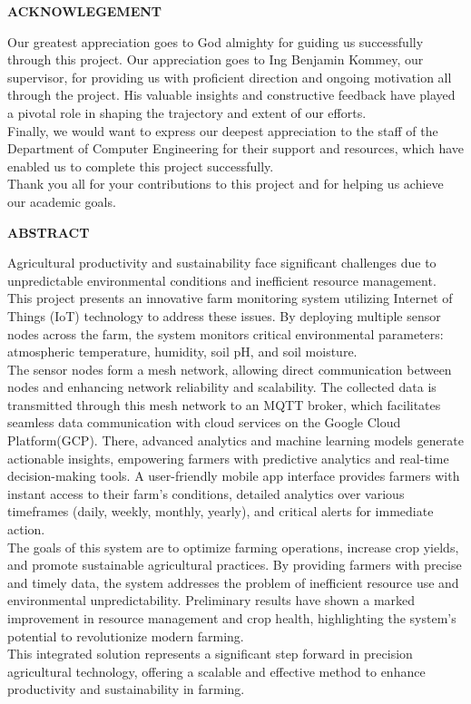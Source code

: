 \documentclass[12pt, a4paper]{article}
\begin{document}
\begin{center}
\textbf{ACKNOWLEGEMENT}
\end{center}
Our greatest appreciation goes to God almighty for guiding us successfully through this project. Our appreciation goes to Ing Benjamin Kommey, our supervisor, for providing us with proficient direction and ongoing motivation all through the project. His valuable insights and constructive feedback have played a pivotal role in shaping the trajectory and extent of our efforts.\\
Finally, we would want to express our deepest appreciation to the staff of the Department of Computer Engineering for their support and resources, which have enabled us to complete this project successfully.\\ Thank you all for your contributions to this project and for helping us achieve our academic goals.
\newpage

\begin{center}
\textbf{ABSTRACT}
\end{center}
Agricultural productivity and sustainability face significant challenges due to unpredictable environmental conditions and inefficient resource management. This project presents an innovative farm monitoring system utilizing Internet of Things (IoT) technology to address these issues. By deploying multiple sensor nodes across the farm, the system monitors critical environmental parameters: atmospheric temperature, humidity, soil pH, and soil moisture.\\ 
The sensor nodes form a mesh network, allowing direct communication between nodes and enhancing network reliability and scalability. The collected data is transmitted through this mesh network to an MQTT broker, which facilitates seamless data communication with cloud services on the Google Cloud Platform(GCP). There, advanced analytics and machine learning models generate actionable insights, empowering farmers with predictive analytics and real-time decision-making tools.
A user-friendly mobile app interface provides farmers with instant access to their farm’s conditions, detailed analytics over various timeframes (daily, weekly, monthly, yearly), and critical alerts for immediate action.\\
The goals of this system are to optimize farming operations, increase crop yields, and promote sustainable agricultural practices. By providing farmers with precise and timely data, the system addresses the problem of inefficient resource use and environmental unpredictability. Preliminary results have shown a marked improvement in resource management and crop health, highlighting the system’s
potential to revolutionize modern farming. \\
This integrated solution represents a significant step forward in precision agricultural technology, offering a scalable and effective method to enhance productivity and sustainability in farming.
\end{document}
